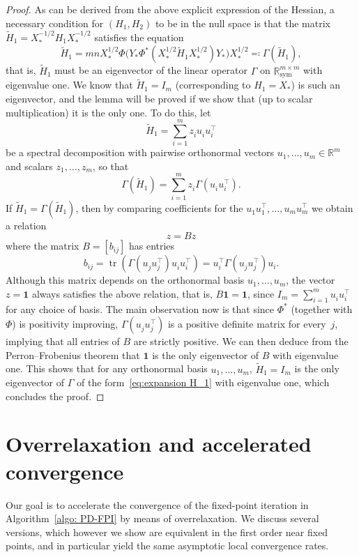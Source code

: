 \documentclass[a4paper]{article}
\newcommand{\R}{\mathbb{R}}
\DeclareMathOperator{\tr}{tr}
\theoremstyle{definition}
\numberwithin{equation}{section}
\begin{document}
\begin{proof}
As can be derived from the above explicit expression of the Hessian, a necessary condition for $(H_1,H_2)$ to be in the null space is that the matrix $\tilde H_1 = X_*^{-1/2} H_1 X_*^{-1/2}$ satisfies the equation
\[
 \tilde H_1 = mn X_*^{1/2} \Phi \big( Y_* \Phi^*(X_*^{1/2} \tilde H_1 X_*^{1/2}) Y_* \big) X_*^{1/2} \eqqcolon \Gamma( \tilde H_1 ),
\]
that is, $\tilde H_1$ must be an eigenvector of the linear operator $\Gamma$ on $\R^{m \times m}_{\mathrm{sym}}$ with eigenvalue one. We know that $\tilde H_1 = I_m$ (corresponding to $H_1 = X_*$) is such an eigenvector, and the lemma will be proved if we show that (up to scalar multiplication) it is the only one. To do this, let
\begin{equation}\label{eq:expansion H_1}
 \tilde H_1 = \sum_{i=1}^m z_i^{} u_i^{} u_i^\top
\end{equation}
be a spectral decomposition with pairwise orthonormal vectors $u_1,\dots,u_m \in \R^m$ and scalars $z_1,\dots,z_m$, so that
\[
 \Gamma(\tilde H_1) = \sum_{i=1}^m z_i^{} \Gamma(u_i^{} u_i^\top).
\]
If $\tilde H_1 = \Gamma(\tilde H_1)$, then by comparing coefficients for the $u_1^{} u_1^\top,\dots,u_m^{} u_m^\top$ we obtain a relation
\[
 z = B z
\]
where the matrix $B = [b_{ij}]$ has entries
\[
 b_{ij} = \tr(\Gamma(u_j^{} u_j^\top) u_i^{} u_i^\top) = u_i^\top \Gamma(u_j^{} u_j^\top) u_i.
\]
Although this matrix depends on the orthonormal basis $u_1,\dots,u_m$, the vector $z = \mathbf 1$ always satisfies the above relation, that is, $B \mathbf 1 = \mathbf 1$, since $I_m = \sum_{i=1}^m u_i^{} u_i^\top$ for any choice of basis. The main observation now is that since $\Phi^*$ (together with $\Phi$) is positivity improving, $\Gamma(u_j^{} u_j^\top)$ is a positive definite matrix for every~$j$, implying that all entries of $B$ are strictly positive. We can then deduce from the Perron--Frobenius theorem that $\mathbf 1$ is the only eigenvector of $B$ with eigenvalue one. This shows that for any orthonormal basis $u_1,\dots,u_m$, $\tilde H_1 = I_m$ is the only eigenvector of $\Gamma$ of the form~\eqref{eq:expansion H_1} with eigenvalue one, which concludes the proof.
\end{proof}

\section{Overrelaxation and accelerated convergence}\label{sec: overrelaxation}

Our goal is to accelerate the convergence of the fixed-point iteration in Algorithm~\ref{algo: PD-FPI} by means of overrelaxation. We discuss several versions, which however we show are equivalent in the first order near fixed points, and in particular yield the same asymptotic local convergence rates.
\end{document}
